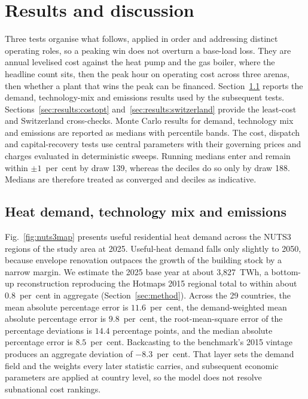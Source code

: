 \section{Results and discussion}
\label{sec:results}

Three tests organise what follows, applied in order and addressing distinct operating roles, so a peaking win does not overturn a base-load loss. They are annual levelised cost against the heat
pump and the gas boiler, where the headline count sits, then the peak hour on operating
cost across three arenas, then whether a plant that wins the peak can be financed.
Section~\ref{sec:results:mix} reports the demand, technology-mix and emissions results
used by the subsequent tests. Sections~\ref{sec:results:costopt}
and~\ref{sec:results:switzerland} provide the least-cost and Switzerland cross-checks.
Monte Carlo results for demand, technology mix and emissions are reported as medians with
percentile bands. The cost, dispatch and capital-recovery tests use central parameters
with their governing prices and charges evaluated in deterministic sweeps.
Running medians enter and remain within $\pm1$~per~cent by draw 139, whereas the deciles
do so only by draw 188. Medians are therefore treated as converged and deciles as
indicative.

\subsection{Heat demand, technology mix and emissions}
\label{sec:results:mix}

Fig.~\ref{fig:nuts3map} presents useful residential heat demand across the NUTS3 regions of the study area at 2025. Useful-heat demand falls only slightly to 2050, because
envelope renovation outpaces the growth of the building stock by a narrow margin. We estimate the 2025 base
year at about 3{,}827~TWh, a bottom-up reconstruction reproducing the Hotmaps 2015
regional total to within about 0.8~per~cent in aggregate (Section~\ref{sec:method}). Across the 29 countries, the mean absolute percentage error is $11.6$~per~cent, the demand-weighted mean absolute percentage error is $9.8$~per~cent, the root-mean-square error of the percentage deviations is $14.4$ percentage points, and the median absolute percentage error is $8.5$~per~cent. Backcasting to the benchmark's 2015 vintage produces an aggregate deviation of $-8.3$~per~cent. That layer sets the demand field and the weights every later statistic carries, and subsequent economic parameters are applied at country level, so the model does not resolve subnational cost rankings.

